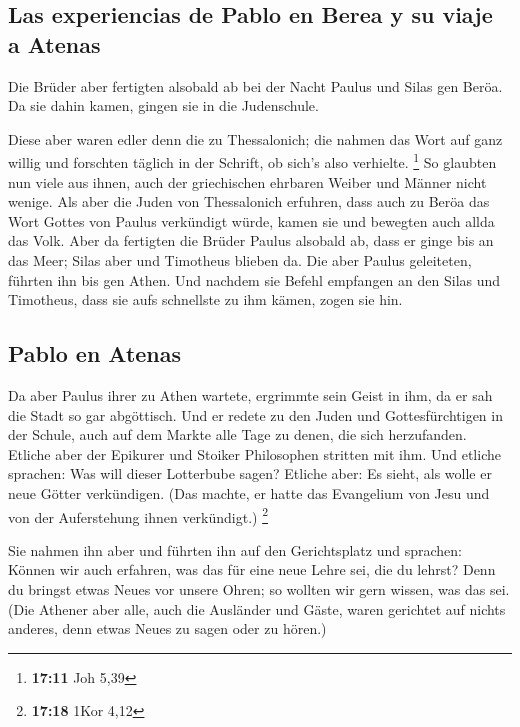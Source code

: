 \hypertarget{las-experiencias-de-pablo-en-berea-y-su-viaje-a-atenas}{%
\subsection{Las experiencias de Pablo en Berea y su viaje a
Atenas}\label{las-experiencias-de-pablo-en-berea-y-su-viaje-a-atenas}}

 Die Brüder aber fertigten alsobald ab bei der Nacht
Paulus und Silas gen Beröa. Da sie dahin kamen, gingen sie in die
Judenschule.

 Diese aber waren edler denn die zu Thessalonich; die
nahmen das Wort auf ganz willig und forschten täglich in der Schrift, ob
sich's also verhielte. \footnote{\textbf{17:11} Joh 5,39}
 So glaubten nun viele aus ihnen, auch der griechischen
ehrbaren Weiber und Männer nicht wenige.  Als aber die
Juden von Thessalonich erfuhren, dass auch zu Beröa das Wort Gottes von
Paulus verkündigt würde, kamen sie und bewegten auch allda das Volk.
 Aber da fertigten die Brüder Paulus alsobald ab, dass er
ginge bis an das Meer; Silas aber und Timotheus blieben da.
 Die aber Paulus geleiteten, führten ihn bis gen Athen.
Und nachdem sie Befehl empfangen an den Silas und Timotheus, dass sie
aufs schnellste zu ihm kämen, zogen sie hin.

\hypertarget{pablo-en-atenas}{%
\subsection{Pablo en Atenas}\label{pablo-en-atenas}}

 Da aber Paulus ihrer zu Athen wartete, ergrimmte sein
Geist in ihm, da er sah die Stadt so gar abgöttisch.  Und
er redete zu den Juden und Gottesfürchtigen in der Schule, auch auf dem
Markte alle Tage zu denen, die sich herzufanden.  Etliche
aber der Epikurer und Stoiker Philosophen stritten mit ihm. Und etliche
sprachen: Was will dieser Lotterbube sagen? Etliche aber: Es sieht, als
wolle er neue Götter verkündigen. (Das machte, er hatte das Evangelium
von Jesu und von der Auferstehung ihnen verkündigt.) \footnote{\textbf{17:18}
  1Kor 4,12}

 Sie nahmen ihn aber und führten ihn auf den
Gerichtsplatz und sprachen: Können wir auch erfahren, was das für eine
neue Lehre sei, die du lehrst?  Denn du bringst etwas
Neues vor unsere Ohren; so wollten wir gern wissen, was das sei.
 (Die Athener aber alle, auch die Ausländer und Gäste,
waren gerichtet auf nichts anderes, denn etwas Neues zu sagen oder zu
hören.)

